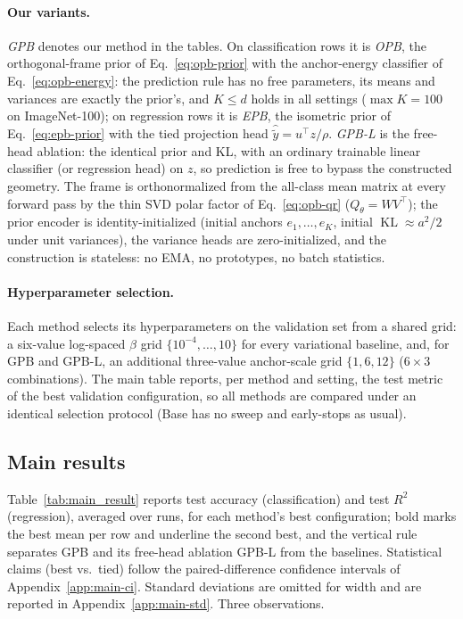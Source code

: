 \documentclass{article} %
\theoremstyle{plain}
\theoremstyle{remark}
\renewcommand{\KL}{\operatorname{KL}}
\begin{document}
\paragraph{Our variants.} \emph{GPB} denotes our method in the tables. On
classification rows it is \emph{OPB}, the orthogonal-frame prior of
Eq.~\eqref{eq:opb-prior} with the anchor-energy classifier of
Eq.~\eqref{eq:opb-energy}: the prediction rule has no free parameters, its means
and variances are exactly the prior's, and $K \le d$ holds in all settings
($\max K = 100$ on ImageNet-100); on regression rows it is \emph{EPB}, the isometric
prior of Eq.~\eqref{eq:epb-prior} with the tied projection head
$\hat{\tilde y} = u^{\top}z/\rho$. \emph{GPB-L} is the free-head ablation: the
identical prior and KL, with an ordinary trainable linear classifier (or regression
head) on $z$, so prediction is free to bypass the constructed geometry. The frame is
orthonormalized from the all-class mean matrix at every forward pass by the thin SVD
polar factor of Eq.~\eqref{eq:opb-qr} ($Q_\theta = W V^{\top}$); the prior encoder is
identity-initialized (initial anchors
$e_1,\dots,e_K$, initial $\KL \approx a^2/2$ under unit variances), the variance
heads are zero-initialized, and the construction is stateless: no EMA, no
prototypes, no batch statistics.

\paragraph{Hyperparameter selection.} Each method selects its hyperparameters on the
validation set from a shared grid: a six-value log-spaced $\beta$ grid
$\{10^{-4},\dots,10\}$ for every variational baseline, and, for GPB and GPB-L, an
additional three-value anchor-scale grid $\{1,6,12\}$ ($6\times3$ combinations).
The main table reports, per method and setting, the test metric of the best
validation configuration, so all methods are compared under an identical selection
protocol (Base has no sweep and early-stops as usual).

\subsection{Main results}
\label{sec:main-results}



Table~\ref{tab:main_result} reports test accuracy (classification) and test $R^2$
(regression), averaged over runs, for each method's best configuration; bold
marks the best mean per row and underline the second best, and the vertical rule
separates GPB and its free-head ablation GPB-L from the baselines. Statistical
claims (best vs.\ tied) follow the paired-difference confidence intervals of
Appendix~\ref{app:main-ci}.
Standard deviations are omitted for width and are reported in
Appendix~\ref{app:main-std}. Three
observations.
\end{document}
